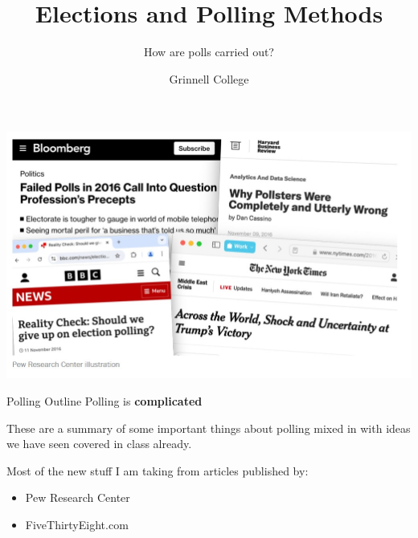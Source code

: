 \documentclass{beamer}
\title[Introduction to Statistics]{Elections and Polling Methods}
\subtitle{How are polls carried out?}
\author{Grinnell College}
\date{}
\begin{document}
\begin{frame}
  \titlepage
\end{frame}

\begin{frame}
\includegraphics[scale=.7]{img/polling_headlines.jpg}    
\end{frame}

\begin{frame}{Polling Outline}
Polling is \textbf{complicated} \vspace{8mm}

These are a summary of some important things about polling mixed in with ideas we have seen covered in class already. \vspace{8mm}

Most of the new stuff I am taking from articles published by:
\begin{itemize}
    \item Pew Research Center
    \item FiveThirtyEight.com
\end{itemize}
\end{frame}
\end{document}
